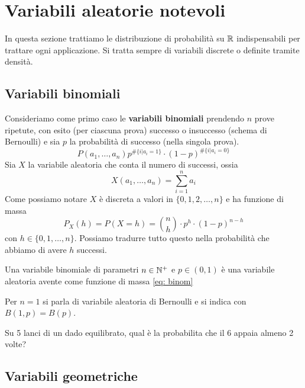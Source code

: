 \section{Variabili aleatorie notevoli}
In questa sezione trattiamo le distribuzione di probabilità su $\mathbb{R}$ indispensabili per trattare
ogni applicazione. Si tratta sempre di variabili discrete o definite tramite densità.

\subsection{Variabili binomiali}
Consideriamo come primo caso le \textbf{variabili binomiali} prendendo $n$ prove ripetute, con
esito (per ciascuna prova) successo o insuccesso (schema di Bernoulli) e sia $p$ la probabilità di
successo (nella singola prova).
\[ P(a_1, \dots, a_n) p^{\# \{i | a_i=1\}} \cdot (1-p)^{\# \{ i | a_i=0 \}} \]
Sia $X$ la variabile aleatoria che conta il numero di successi, ossia
\[ X(a_1, \dots, a_n) = \sum_{i=1}^n a_i \]
Come possiamo notare $X$ è discreta a valori in $\{0,1,2,\dots,n\}$ e ha funzione di massa
\begin{equation}\label{eq: binom}
	P_X(h) = P(X = h) = \binom{n}{h} \cdot p^h \cdot (1-p)^{n-h}
\end{equation}
con $h \in \{ 0, 1, \dots, n \}$. Possiamo tradurre tutto questo nella probabilità che abbiamo di
avere $h$ successi.

Una variabile binomiale di parametri $n \in \mathbb{N}^+$ e $p \in (0,1)$ è una variabile aleatoria avente
come funzione di massa \ref{eq: binom}

\begin{observation}
	Per $n=1$ si parla di variabile aleatoria di Bernoulli e si indica con $B(1,p) = B(p)$.
\end{observation}

\begin{example}
	Su 5 lanci di un dado equilibrato, qual è la probabilita che il 6 appaia almeno 2 volte?
\end{example}

\subsection{Variabili geometriche}